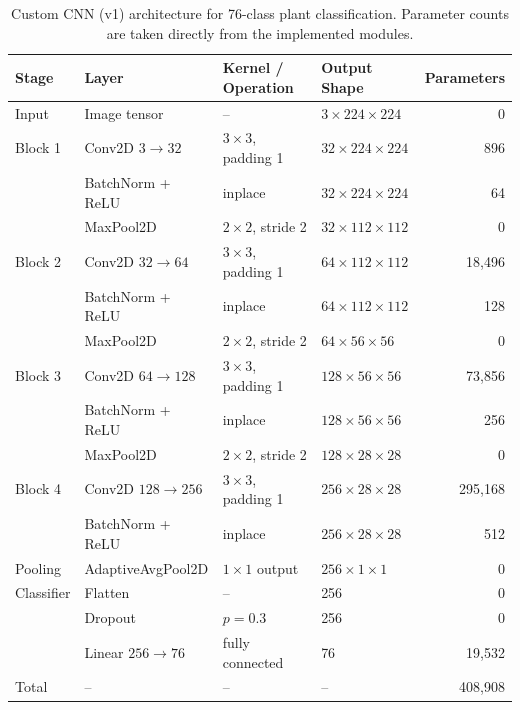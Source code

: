 \documentclass[12pt,a4paper]{article}
\begin{document}
\begin{table}[H]
    \centering
    \caption{Custom CNN (v1) architecture for 76-class plant classification. Parameter counts are taken directly from the implemented modules.}
    \begin{tabular}{llllr}
        \toprule
        Stage & Layer & Kernel / Operation & Output Shape & Parameters \\
        \midrule
        Input & Image tensor & -- & $3 \times 224 \times 224$ & 0 \\
        Block 1 & Conv2D $3 \rightarrow 32$ & $3 \times 3$, padding 1 & $32 \times 224 \times 224$ & 896 \\
                & BatchNorm + ReLU & inplace & $32 \times 224 \times 224$ & 64 \\
                & MaxPool2D & $2 \times 2$, stride 2 & $32 \times 112 \times 112$ & 0 \\
        Block 2 & Conv2D $32 \rightarrow 64$ & $3 \times 3$, padding 1 & $64 \times 112 \times 112$ & 18{,}496 \\
                & BatchNorm + ReLU & inplace & $64 \times 112 \times 112$ & 128 \\
                & MaxPool2D & $2 \times 2$, stride 2 & $64 \times 56 \times 56$ & 0 \\
        Block 3 & Conv2D $64 \rightarrow 128$ & $3 \times 3$, padding 1 & $128 \times 56 \times 56$ & 73{,}856 \\
                & BatchNorm + ReLU & inplace & $128 \times 56 \times 56$ & 256 \\
                & MaxPool2D & $2 \times 2$, stride 2 & $128 \times 28 \times 28$ & 0 \\
        Block 4 & Conv2D $128 \rightarrow 256$ & $3 \times 3$, padding 1 & $256 \times 28 \times 28$ & 295{,}168 \\
                & BatchNorm + ReLU & inplace & $256 \times 28 \times 28$ & 512 \\
        Pooling & AdaptiveAvgPool2D & $1 \times 1$ output & $256 \times 1 \times 1$ & 0 \\
        Classifier & Flatten & -- & 256 & 0 \\
                   & Dropout & $p=0.3$ & 256 & 0 \\
                   & Linear $256 \rightarrow 76$ & fully connected & 76 & 19{,}532 \\
        \midrule
        Total & -- & -- & -- & 408{,}908 \\
        \bottomrule
    \end{tabular}
\end{table}
\end{document}
